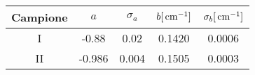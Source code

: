 \begin{tabulary}{\textwidth}{CCCCC}
\toprule
Campione & $a$  & $\sigma_a$ & $b [\,\mathrm{cm}^{-1}]$ & $\sigma_b [\,\mathrm{cm}^{-1}]$\\ \midrule
I & -0.88 & 0.02 & 0.1420 & 0.0006\\ \midrule
II & -0.986 & 0.004 & 0.1505 & 0.0003\\
\bottomrule
\end{tabulary}

